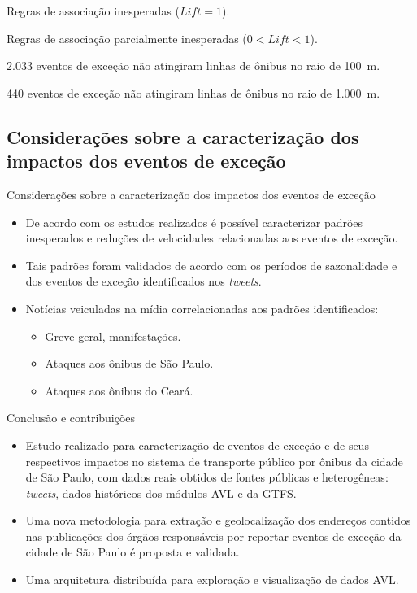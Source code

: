 \documentclass{beamer}
\begin{document}
\begin{frame}
\begin{table}[!htb]
\begin{adjustbox}{max height=10mm, width=3in}
\begin{threeparttable}
\begin{tablenotes}
            \item[d] Regras de associação inesperadas ($Lift = 1$).
            \item[e] Regras de associação parcialmente inesperadas ($0 < Lift < 1$).
            \item[f] 2.033 eventos de exceção não atingiram linhas de ônibus no raio de 100~m.
            \item[g] 440 eventos de exceção não atingiram linhas de ônibus no raio de 1.000~m.
        \end{tablenotes}
\end{threeparttable}
\end{adjustbox}
\end{table}
\end{frame}
\subsection{Considerações sobre a caracterização dos impactos dos eventos de exceção}\begin{frame}{Considerações sobre a caracterização dos impactos dos eventos de exceção}
\begin{itemize}
\item De acordo com os estudos realizados \alert{é possível caracterizar padrões inesperados e reduções de velocidades relacionadas aos eventos de exceção}. 
\item Tais padrões foram validados de acordo com os \alert{períodos de sazonalidade e dos eventos de exceção identificados nos \textit{tweets}}. 
\item \alert{Notícias veiculadas na mídia} correlacionadas aos padrões identificados:
\begin{itemize}
\item \alert{Greve geral, manifestações}.
\item \alert{Ataques aos ônibus de São Paulo}.
\item \alert{Ataques aos ônibus do Ceará}.
\end{itemize}

\end{itemize}
\end{frame}
\begin{frame}{Conclusão e contribuições}
\begin{itemize}
\item Estudo realizado para caracterização de eventos de exceção e de seus respectivos impactos no sistema de transporte público por ônibus da cidade de São Paulo, com dados reais obtidos de fontes públicas e heterogêneas:  \textit{tweets}, dados históricos dos módulos AVL e da GTFS.
\item Uma nova metodologia para extração e geolocalização dos endereços contidos nas publicações dos órgãos responsáveis por reportar eventos de exceção da cidade de São Paulo é proposta e validada.
\item Uma arquitetura distribuída para exploração e visualização de dados AVL.
\end{itemize}
\end{frame}
\end{document}
